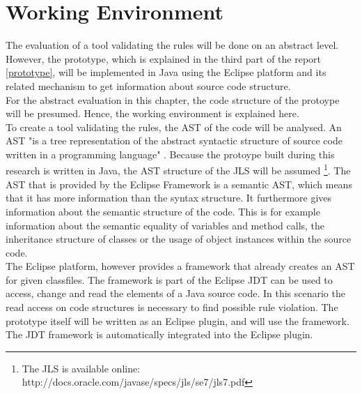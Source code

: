 \section{Working Environment}
The evaluation of a tool validating the rules will be done on an abstract level. However, the prototype, which is explained in the third part of the report \ref{prototype}, will be implemented in Java using the Eclipse platform and its related mechanism to get information about source code structure. 
\\
For the abstract evaluation in this chapter, the code structure of the protoype will be presumed. Hence, the working environment is explained here. 
\\
To create a tool validating the rules, the \acf{AST} of the code will be analysed. An \acf{AST} "is a tree representation of the abstract syntactic structure of source code written in a programming language" \cite[Abstract Syntax Tree]{wiki}. Because the protoype built during this research is written in Java, the \acf{AST} structure of the \acf{JLS} will be assumed \footnote{The \acf{JLS} is available online: http://docs.oracle.com/javase/specs/jls/se7/jls7.pdf}. The \acf{AST} that is provided by the Eclipse Framework is a semantic \acf{AST}, which means that it has more information than the syntax structure. It furthermore gives information about the semantic structure of the code. This is for example information about the semantic equality of variables and method calls, the inheritance structure of classes or the usage of object instances within the source code.
\\



The Eclipse platform, however provides a framework that already creates an \acf{AST} for given classfiles. The framework is part of the Eclipse \acf{JDT} can be used to access, change and read the elements of a Java source code. In this scenario the read access on code structures is necessary to find possible rule violation. The prototype itself will be written as an Eclipse plugin, and will use the framework. The \acf{JDT} framework is automatically integrated into the Eclipse plugin. 
\\


